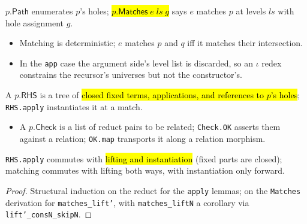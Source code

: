 \begin{definition}
\label{inductive:pattern-matches}
\leanok
{}
 $p.\mathsf{Path}$ enumerates $p$'s holes; \hl{$p.\mathsf{Matches}\;e\;ls\;g$}
says $e$ matches $p$ at levels $ls$ with hole assignment $g$.
\begin{itemize}
\item Matching is deterministic; $e$ matches $p$ and $q$ iff it matches their intersection.
\item {} In the \texttt{app} case the argument side's level list is discarded, so
an $\iota$ redex constrains the recursor's universes but not the constructor's.
\end{itemize}
\end{definition}

\begin{definition}
\label{inductive:pattern-rhs}
\leanok
{}
 A $p.\mathsf{RHS}$ is a tree of \hl{closed fixed terms, applications, and
references to $p$'s holes}; \texttt{RHS.apply} instantiates it at a match.
\begin{itemize}
\item A $p.\mathsf{Check}$ is a list of reduct pairs to be related; \texttt{Check.OK}
asserts them against a relation; \texttt{OK.map} transports it along a relation morphism.
\end{itemize}
\end{definition}

\begin{lemma}
\label{family:pattern-transport-master}
\leanok
{}
 \texttt{RHS.apply} commutes with \hl{lifting and instantiation} (fixed parts
are closed); matching commutes with lifting both ways, with instantiation only forward.
\end{lemma}
\begin{proof}
\leanok
{} Structural induction on the reduct for the \texttt{apply} lemmas; on the
\texttt{Matches} derivation for \texttt{matches\_lift'}, with \texttt{matches\_liftN} a
corollary via \texttt{lift'\_consN\_skipN}.
\end{proof}

